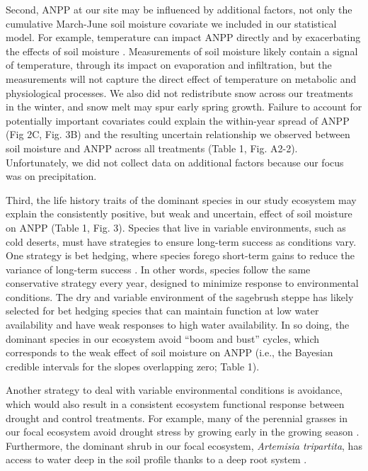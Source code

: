 \documentclass[fleqn,10pt,lineno]{wlpeerj} %
\begin{document}
Second, ANPP at our site may be influenced by additional factors, not
only the cumulative March-June soil moisture covariate we included in
our statistical model. For example, temperature can impact ANPP directly
\citep{Epstein1997} and by exacerbating the effects of soil moisture
\citep{DeBoeck2011}. Measurements of soil moisture likely contain a
signal of temperature, through its impact on evaporation and
infiltration, but the measurements will not capture the direct effect of
temperature on metabolic and physiological processes. We also did not
redistribute snow across our treatments in the winter, and snow melt may
spur early spring growth. Failure to account for potentially important
covariates could explain the within-year spread of ANPP (Fig 2C, Fig.
3B) and the resulting uncertain relationship we observed between soil
moisture and ANPP across all treatments (Table 1, Fig. A2-2).
Unfortunately, we did not collect data on additional factors because our
focus was on precipitation.

Third, the life history traits of the dominant species in our study
ecosystem may explain the consistently positive, but weak and uncertain,
effect of soil moisture on ANPP (Table 1, Fig. 3). Species that live in
variable environments, such as cold deserts, must have strategies to
ensure long-term success as conditions vary. One strategy is bet
hedging, where species forego short-term gains to reduce the variance of
long-term success \citep{Seger1987}. In other words, species follow the
same conservative strategy every year, designed to minimize response to
environmental conditions. The dry and variable environment of the
sagebrush steppe has likely selected for bet hedging species that can
maintain function at low water availability and have weak responses to
high water availability. In so doing, the dominant species in our
ecosystem avoid ``boom and bust'' cycles, which corresponds to the weak
effect of soil moisture on ANPP (i.e., the Bayesian credible intervals
for the slopes overlapping zero; Table 1).

Another strategy to deal with variable environmental conditions is
avoidance, which would also result in a consistent ecosystem functional
response between drought and control treatments. For example, many of
the perennial grasses in our focal ecosystem avoid drought stress by
growing early in the growing season \citep[A.R. Kleinhesselink, personal
observation]{Blaisdell1958}. Furthermore, the dominant shrub in our
focal ecosystem, \emph{Artemisia tripartita}, has access to water deep
in the soil profile thanks to a deep root system
\citep{Kulmatiski2017a}.
\end{document}
